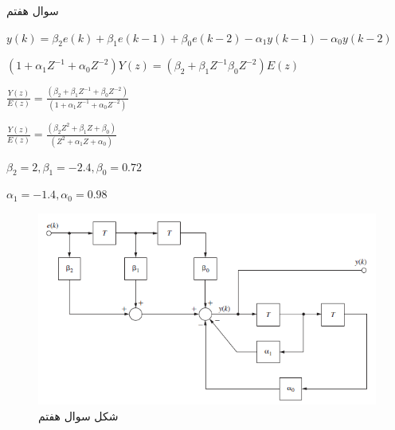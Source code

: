 \documentclass{article}
\begin{document}
\begin{problem}{سوال هفتم}
	\raggedleft
	
	$y(k) = \beta_2 e(k) + \beta_1 e(k-1) + \beta_0 e(k-2) - \alpha_1 y(k-1) - \alpha_0 y(k-2)$
	
	
	$(1 + \alpha_1 Z^{-1} + \alpha_0 Z^{-2}) Y(z) = (\beta_2 + \beta_1 Z^{-1} \beta_0 Z^{-2})E(z)$
	
	
	$\frac{Y(z)}{E(z)} = \frac{(\beta_2 + \beta_1 Z^{-1}+ \beta_0 Z^{-2})}{(1 + \alpha_1 Z^{-1} + \alpha_0 Z^{-2})} $
	
	
	$\frac{Y(z)}{E(z)} = \frac{(\beta_2Z^2 + \beta_1 Z+ \beta_0)}{(Z^2 + \alpha_1 Z + \alpha_0)} $
	
	
	$\beta_2 = 2, \beta_1 = -2.4, \beta_0 = 0.72 $
	
	$\alpha_1 = -1.4, \alpha_0 = 0.98 $
	
\end{problem}
\begin{figure}
	\includegraphics[width=\linewidth]{Second Series/2.png}
	\caption{شکل سوال هفتم}
\end{figure}
\end{document}
